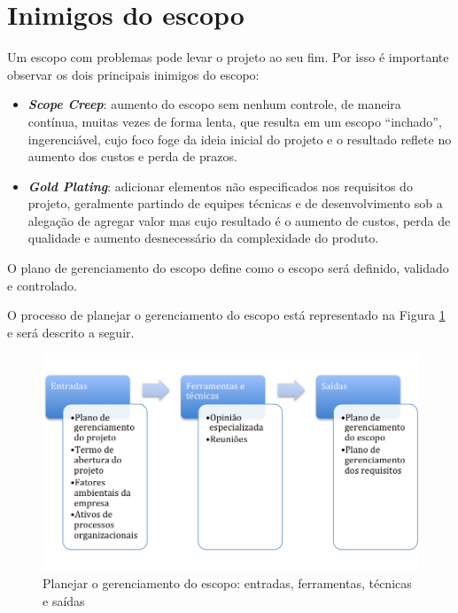 \section{Inimigos do escopo}

Um escopo com problemas pode levar o projeto ao seu fim. Por isso é importante observar os dois principais inimigos do escopo:

\begin{itemize}
	
	\item \textbf{\textit{Scope Creep}}: aumento do escopo sem nenhum controle, de maneira contínua, muitas vezes de forma lenta, que resulta em um escopo ``inchado'', ingerenciável, cujo foco foge da ideia inicial do projeto e o resultado reflete no aumento dos custos e perda de prazos.
	
	\item \textbf{\textit{Gold Plating}}: adicionar elementos não especificados nos requisitos do projeto, geralmente partindo de equipes técnicas e de desenvolvimento sob a alegação de agregar valor mas cujo resultado é o aumento de custos, perda de qualidade e aumento desnecessário da complexidade do produto.
	
\end{itemize}


O plano de gerenciamento do escopo define como o escopo será definido, validado e controlado.

O processo de planejar o gerenciamento do escopo está representado na Figura \ref{fig:escopo:plan:efts} e será descrito a seguir.

\begin{figure}[!h]
	\centering
	\includegraphics[scale=0.5]{Figuras/escopo_efts_planejar.png}
	\caption{Planejar o gerenciamento do escopo: entradas, ferramentas, técnicas e saídas}
	\label{fig:escopo:plan:efts}
\end{figure}

